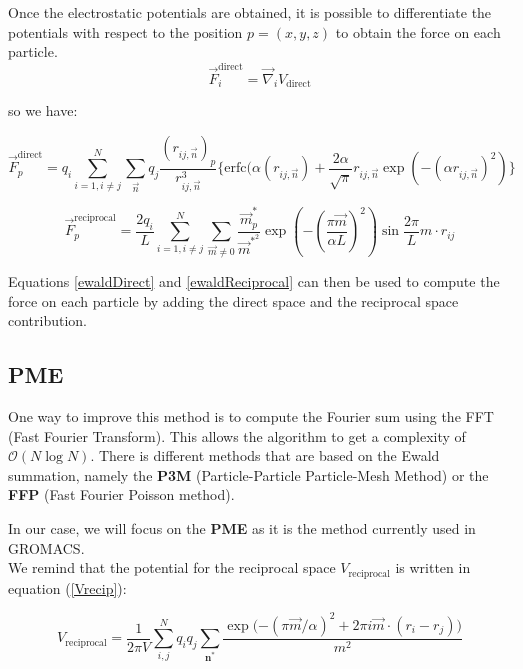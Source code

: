 \documentclass[12pt,twoside,a4paper]{report}
\begin{document}
Once the electrostatic potentials are obtained, it is possible to differentiate the potentials with respect to the position $p=(x,y,z)$ to obtain the force on each particle.\\

\begin{equation}
   \overrightarrow{F}_i^{\text{direct}} = \overrightarrow{\nabla}_i V_{\text{direct}} 
\end{equation}


so we have:

\begin{equation}
\label{ewaldDirect}
   \overrightarrow{F}_p^{\text{direct}} = q_i \sum\limits_{i=1,i\neq j}^N \sum\limits_{\vec{n}} q_j \frac{(r_{ij,\vec{n}})_p}{r_{ij,\vec{n}}^3}
   \{\text{erfc}(\alpha (r_{ij,\vec{n}}) + \frac{2\alpha}{\sqrt{\pi}} r_{ij,\vec{n}} \exp(-(\alpha r_{ij,\vec{n}})^2)\}
\end{equation}


\begin{equation}
\label{ewaldReciprocal}
   \overrightarrow{F}_p^{\text{reciprocal}} = \frac{2 q_i}{L} \sum\limits_{i=1,i\neq j}^N \sum_{\vec{m} \neq 0} \frac{\vec{m}_p^*}{\vec{m}^{*^2}} \exp{(-(\frac{\pi \vec{m}}{\alpha L})^2)}\sin{\frac{2\pi}{L} m \cdot r_{ij} }
\end{equation}

Equations \ref{ewaldDirect} and \ref{ewaldReciprocal} can then be used to compute the force on each particle by adding the direct space and the reciprocal space contribution.\\


\subsection{PME}
One way to improve this method is to compute the Fourier sum using the FFT (Fast Fourier Transform). This allows the algorithm to get a complexity of $\mathcal{O}(N\log N)$. There is different methods that are based on the Ewald summation, namely the \textbf{P3M} (Particle-Particle Particle-Mesh Method) or the \textbf{FFP} (Fast Fourier Poisson method). 

In our case, we will focus on the \textbf{PME} as it is the method currently used in GROMACS. \\

We remind that the potential for the reciprocal space $V_{\text{reciprocal}}$ is written in equation (\ref{Vrecip}):


\begin{equation*}
    V_{\text{reciprocal}} =\frac{1}{2 \pi V} \sum\limits_{i,j}^{N} q_i q_j \sum\limits_{\textbf{n}^*} \frac{\exp{(-(\pi \overrightarrow{m}/\alpha)^2} +2\pi i \overrightarrow{m} \cdot (r_i - r_j))}{m^2}    
\end{equation*}
\end{document}
